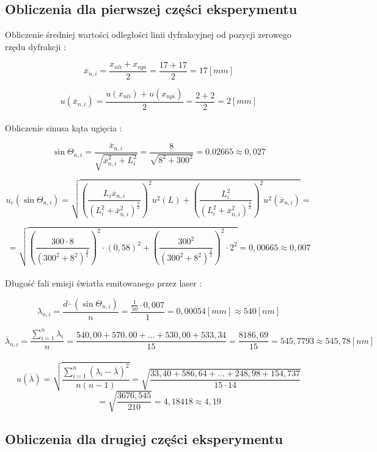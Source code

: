 \documentclass[12pt]{article}
\begin{document}
\subsection{Obliczenia dla pierwszej części eksperymentu}

Obliczenie średniej wartości odległości linii dyfrakcyjnej od pozycji
zerowego rzędu dyfrakcji : 

$$ \overline{x}_{n,i} = \frac{x_{nli} + x_{npi}}{2} = \frac{17 + 17}{2} = 17[mm]$$

$$ u(\overline{x}_{n,i}) = \frac{u(x_{nli}) + u(x_{npi})}{2} = \frac{2 + 2}{2} = 2[mm] $$ \\

Obliczenie sinusa kąta ugięcia :

$$ \sin \Theta_{n,i} = \frac{\overline{x}_{n,i}}{\sqrt{\overline{x}^{2}_{n,i} + L^{2}_i}}
= \frac{8}{\sqrt{8^2 + 300^2}} = 0.02665 \approx 0,027 $$

$$ u_c(\sin \Theta_{n,i}) = \sqrt{\left(\frac{L_i \overline{x}_{n,i}}{\left(L^2_i + \overline{x}^2_{n,i}\right)^{\frac{3}{2}}}\right)^2 u^2(L) + 
\left(\frac{L^2_i}{(L^2_i + \overline{x}^2_{n,i})^{\frac{3}{2}}}\right)^2 u^2(\overline{x}_{n,i})} = $$

$$ = \sqrt{\left( \frac{300 \cdot 8}{\left(300^2 + 8^2\right)^{\frac{3}{2}}} \right)^2 \cdot (0,58)^2 +
\left( \frac{300^2}{\left(300^2 + 8^2 \right)^{\frac{3}{2}}} \right)^2 \cdot 2^2 } = 0,00665 \approx 0,007 $$\\

Długość fali emisji światła emitowanego przez laser :

$$ \lambda_{n,i} = \frac{d \cdot (\sin \Theta_{n,i})}{n} = \frac{\frac{1}{50} \cdot 0,007}{1}
= 0,00054[mm] \approx 540[nm] $$

$$ \overline{\lambda}_{n,i} = \frac{\sum\limits_{i = 1}^{n} \lambda_{i}}{n} =
\frac{540,00 + 570,00 + ... + 530,00 + 533,34}{15} = \frac{8186,69}{15} = 545,7793 \approx 545,78[nm] $$ \\

$$ u(\overline{\lambda}) = \sqrt{ \frac{\sum\limits_{i = 1}^{n} \left(\lambda_i - \overline{\lambda} \right)^2}{n(n-1)} }
= \sqrt{ \frac{33,40 + 586,64 + ... + 248,98 + 154,737}{15 \cdot 14} } $$
$$= \sqrt{\frac{3676,545}{210}} = 4,18418 \approx 4,19 $$

\pagebreak

\subsection{Obliczenia dla drugiej części eksperymentu}
\end{document}
